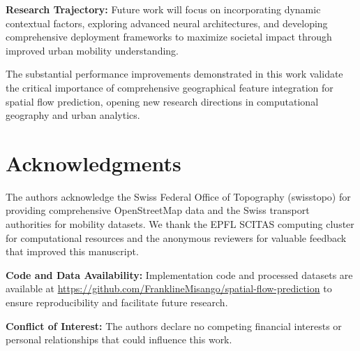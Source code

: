 \documentclass[twocolumn,11pt]{IEEEtran}  %
\begin{document}
\textbf{Research Trajectory:} Future work will focus on incorporating dynamic contextual factors, exploring advanced neural architectures, and developing comprehensive deployment frameworks to maximize societal impact through improved urban mobility understanding.

The substantial performance improvements demonstrated in this work validate the critical importance of comprehensive geographical feature integration for spatial flow prediction, opening new research directions in computational geography and urban analytics.

\section*{Acknowledgments}

The authors acknowledge the Swiss Federal Office of Topography (swisstopo) for providing comprehensive OpenStreetMap data and the Swiss transport authorities for mobility datasets. We thank the EPFL SCITAS computing cluster for computational resources and the anonymous reviewers for valuable feedback that improved this manuscript.

\textbf{Code and Data Availability:} Implementation code and processed datasets are available at \url{https://github.com/FranklineMisango/spatial-flow-prediction} to ensure reproducibility and facilitate future research.

\textbf{Conflict of Interest:} The authors declare no competing financial interests or personal relationships that could influence this work.
\end{document}
